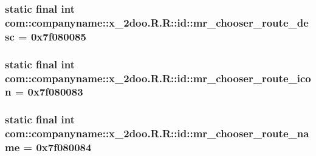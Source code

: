 \hypertarget{classcom_1_1companyname_1_1x__2doo_1_1_r_1_1id_f1d4a889be431fa87118baceabd7575a}{
\subsubsection[{mr\_\-chooser\_\-route\_\-desc}]{\setlength{\rightskip}{0pt plus 5cm}static final int com::companyname::x\_\-2doo.R.R::id::mr\_\-chooser\_\-route\_\-desc = 0x7f080085}}
\label{classcom_1_1companyname_1_1x__2doo_1_1_r_1_1id_f1d4a889be431fa87118baceabd7575a}


\hypertarget{classcom_1_1companyname_1_1x__2doo_1_1_r_1_1id_fd8c53247c3d16076c079e4e95a0b731}{
\subsubsection[{mr\_\-chooser\_\-route\_\-icon}]{\setlength{\rightskip}{0pt plus 5cm}static final int com::companyname::x\_\-2doo.R.R::id::mr\_\-chooser\_\-route\_\-icon = 0x7f080083}}
\label{classcom_1_1companyname_1_1x__2doo_1_1_r_1_1id_fd8c53247c3d16076c079e4e95a0b731}


\hypertarget{classcom_1_1companyname_1_1x__2doo_1_1_r_1_1id_60207c69d366012a3f136f525a18f69b}{
\subsubsection[{mr\_\-chooser\_\-route\_\-name}]{\setlength{\rightskip}{0pt plus 5cm}static final int com::companyname::x\_\-2doo.R.R::id::mr\_\-chooser\_\-route\_\-name = 0x7f080084}}
\label{classcom_1_1companyname_1_1x__2doo_1_1_r_1_1id_60207c69d366012a3f136f525a18f69b}


